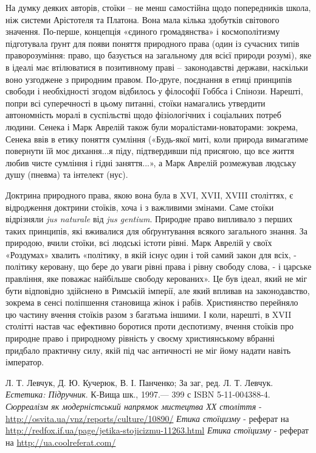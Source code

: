\documentclass[14pt]{extarticle} %
\begin{document}
На думку деяких авторів, стоїки – не менш самостійна щодо попередників школа, ніж системи Арістотеля та Платона. Вона мала кілька здобутків
світового значення. По-перше, концепція «єдиного громадянства» і космополітизму підготувала ґрунт для появи поняття природного права 
(один із сучасних типів праворозуміння: право, що базується на загальному для всієї природи розумі), яке в ідеалі має втілюватися в позитивному 
праві – законодавстві держави, наскільки воно узгоджене з природним правом. По-друге, поєднання в етиці принципів свободи і необхідності згодом 
відбилось у філософії Гоббса і Спінози.
Нарешті, попри всі суперечності в цьому питанні, стоїки намагались утвердити автономність моралі в суспільстві щодо фізіологічних і соціальних потреб людини.
Сенека і Марк Аврелій також були моралістами-новаторами: зокрема, Сенека ввів в етику поняття сумління («Будь-якої миті, коли природа
вимагатиме повернути їй моє дихання...я піду, підтвердивши під присягою, що все життя любив
чисте сумління і гідні заняття...», а Марк Аврелій розмежував людську душу (пневма) та інтелект (нус).

Доктрина природного права, якою вона була в XVI, XVII, XVIII століттях, є відродження доктрини стоїків, хоча і з важливими змінами. Саме стоїки 
відрізняли \textit{jus naturale} від \textit{jus gentium}.
Природне право випливало з перших таких принципів, які вживалися для обґрунтування всякого загального 
знання. За природою, вчили стоїки, всі людські істоти рівні. Марк Аврелій у своїх «Роздумах» хвалить «політику, в якій існує один і той самий
закон для всіх, - політику керовану, що бере до уваги рівні права і рівну свободу слова, - і царське правління, яке поважає найбільше свободу
керованих». Це був ідеал, який не міг бути відповідно здійснено в Римській імперії, але який впливав на законодавство, зокрема в сенсі
поліпшення становища жінок і рабів. Християнство перейняло цю частину вчення стоїків разом з багатьма іншими. І коли, нарешті,
в XVII столітті настав час ефективно боротися проти деспотизму, вчення стоїків про природне право і природному рівність у своєму християнському 
вбранні придбало практичну силу, якій під час античності не міг йому надати навіть імператор.
\begin{thebibliography}{9}
Л. Т. Левчук, Д. Ю. Кучерюк, В. І. Панченко; За заг, ред. Л. Т. Левчук.
{\em Естетика: Підручник}.
К-Вища шк., 1997.— 399 с ISBN 5-11-004388-4.
{\em Сюрреалізм як модерністський напрямок мистецтва ХХ століття} - \url{http://osvita.ua/vnz/reports/culture/10890/}
{\em Етика стоїцизму} - реферат на \url{http://redfox.if.ua/page/jetika-stojicizmu-11263.html}
{\em Етика стоїцизму} - реферат на \url{http://ua.coolreferat.com/}
\end{thebibliography}
\end{document}
